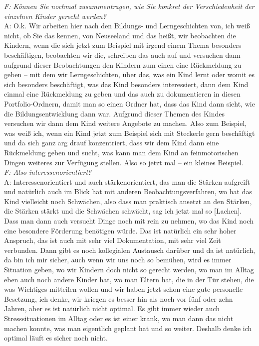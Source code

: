 \begin{linenumbers*}
\emph{F: Können Sie nochmal zusammentragen, wie Sie konkret der Verschiedenheit der einzelnen Kinder gerecht werden?}\\
A: O.k. Wir arbeiten hier nach den Bildungs- und Lerngeschichten von, ich weiß nicht, ob Sie das kennen, von Neuseeland und das heißt, wir beobachten die Kindern, wenn die sich jetzt zum Beispiel mit irgend einem Thema besonders beschäftigen, beobachten wir die, schreiben das auch auf und versuchen dann aufgrund dieser Beobachtungen den Kindern zum einen eine Rückmeldung zu geben – mit dem wir Lerngeschichten, über das, was ein Kind lernt oder womit es sich besonders beschäftigt, was das Kind besonders interessiert, dann dem Kind einmal eine Rückmeldung zu geben und das auch zu dokumentieren in diesen Portfolio-Ordnern, damit man so einen Ordner hat, dass das Kind dann sieht, wie die Bildungsentwicklung dann war. Aufgrund dieser Themen des Kindes versuchen wir dann dem Kind weitere Angebote zu machen. Also zum Beispiel, was weiß ich, wenn ein Kind jetzt zum Beispiel sich mit Steckerle gern beschäftigt und da sich ganz arg drauf konzentriert, dass wir dem Kind dann eine Rückmeldung geben und sucht, was kann man dem Kind an feinmotorischen Dingen weiteres zur Verfügung stellen. Also so jetzt mal -- ein kleines Beispiel.\\
\emph{F: Also interessenorientiert?}\\
A: Interessenorientiert und auch stärkenorientiert, das man die Stärken aufgreift und natürlich auch im Blick hat mit anderen Beobachtungsverfahren, wo hat das Kind vielleicht noch Schwächen, also dass man praktisch ansetzt an den Stärken, die Stärken stärkt und die Schwächen schwächt, sag ich jetzt mal so {[Lachen]}.\\
Dass man dann auch versucht Dinge noch mit rein zu nehmen, wo das Kind noch eine besondere Förderung benötigen würde. Das ist natürlich ein sehr hoher Anspruch, das ist auch mit sehr viel Dokumentation, mit sehr viel Zeit verbunden. Dann gibt es noch kollegialen Austausch darüber und da ist natürlich, da bin ich mir sicher, auch wenn wir uns noch so bemühen, wird es immer Situation geben, wo wir Kindern doch nicht so gerecht werden, wo man im Alltag eben auch noch andere Kinder hat, wo man Eltern hat, die in der Tür stehen, die was Wichtiges mitteilen wollen und wir haben jetzt schon eine gute personelle Besetzung, ich denke, wir kriegen es besser hin als noch vor fünf oder zehn Jahren, aber es ist natürlich nicht optimal. Es gibt immer wieder auch Stresssituationen im Alltag oder es ist einer krank, wo man dann das nicht machen konnte, was man eigentlich geplant hat und so weiter. Deshalb denke ich optimal läuft es sicher noch nicht.  


\end{linenumbers*}

